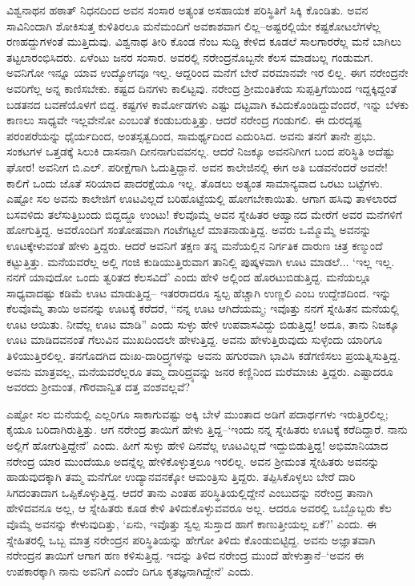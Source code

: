ವಿಶ್ವನಾಥನ ಹಠಾತ್ ನಿಧನದಿಂದ ಅವನ ಸಂಸಾರ ಅತ್ಯಂತ ಅಸಹಾಯಕ ಪರಿಸ್ಥಿತಿಗೆ ಸಿಕ್ಕಿ ಕೊಂಡಿತು. ಅವನ ಸಾವಿನಿಂದಾಗಿ ಶೋಕಿಸುತ್ತ ಕುಳಿತಿರಲೂ ಮನೆಮಂದಿಗೆ ಅವಕಾಶವಾಗ ಲಿಲ್ಲ–ಅಷ್ಟರಲ್ಲಿಯೇ ಕಷ್ಟಕೋಟಲೆಗಳೆಲ್ಲ ರಣಹದ್ದುಗಳಂತೆ ಮುತ್ತಿದುವು. ವಿಶ್ವನಾಥ ತೀರಿ ಕೊಂಡ ನೆಂಬ ಸುದ್ದಿ ಕೇಳಿದ ಕೂಡಲೆ ಸಾಲಗಾರರೆಲ್ಲ ಮನೆ ಬಾಗಿಲು ತಟ್ಟಲಾರಂಭಿಸಿದರು. ಏಳೆಂಟು ಜನರ ಸಂಸಾರ. ಅವರಲ್ಲಿ ನರೇಂದ್ರನೊಬ್ಬನೇ ಕೆಲಸ ಮಾಡಬಲ್ಲ ಗಂಡುಮಗ. ಅವನಿಗೋ ಇನ್ನೂ ಯಾವ ಉದ್ಯೋಗವೂ ಇಲ್ಲ. ಆದ್ದರಿಂದ ಮನೆಗೆ ಬೇರೆ ವರಮಾನವೇ ಇರ ಲಿಲ್ಲ. ಈಗ ನರೇಂದ್ರನೇ ಅವರಿಗೆಲ್ಲ ಅನ್ನ ಕಾಣಿಸಬೇಕು. ಕಷ್ಟದ ದಿನಗಳು ಕಾಲಿಟ್ಟವು. ನರೇಂದ್ರ ಶ್ರೀಮಂತಿಕೆಯ ಸುಪ್ಪತ್ತಿಗೆಯಿಂದ ಇದ್ದಕ್ಕಿದ್ದಂತೆ ಬಡತನದ ಬವಣೆಯೊಳಗೆ ಬಿದ್ದ. ಕಷ್ಟಗಳ ಕಾರ್ಮೋಡಗಳು ಎಷ್ಟು ದಟ್ಟವಾಗಿ ಕವಿದುಕೊಂಡಿದ್ದುವೆಂದರೆ, ಇನ್ನು ಬೆಳಕು ಕಾಣಲು ಸಾಧ್ಯವೇ ಇಲ್ಲವೇನೋ ಎಂಬಂತೆ ಕಂಡುಬರುತ್ತಿತ್ತು. ಆದರೆ ನರೇಂದ್ರ ಗಂಡುಗಲಿ. ಈ ದುರದೃಷ್ಟ ಪರಂಪರೆಯನ್ನು ಧೈರ್ಯದಿಂದ, ಅಂತಸ್ಸತ್ವದಿಂದ, ಸಾಮರ್ಥ್ಯದಿಂದ ಎದುರಿಸಿದ. ಅವನು ತನಗೆ ತಾನೇ ಪ್ರಭು. ಸಂಕಟಗಳ ಒತ್ತಡಕ್ಕೆ ಸಿಲುಕಿ ದಾಸನಾಗಿ ದೀನನಾಗುವವನಲ್ಲ. ಆದರೆ ನಿಜಕ್ಕೂ ಅವನನಿಗೀಗ ಬಂದ ಪರಿಸ್ಥಿತಿ ಅದೆಷ್ಟು ಘೋರ! ಅವನೀಗ ಬಿ.ಎಲ್. ಪರೀಕ್ಷೆಗಾಗಿ ಓದುತ್ತಿದ್ದಾನೆ. ಅವನ ಕಾಲೇಜಿನಲ್ಲಿ ಈಗ ಅತಿ ಬಡವನೆಂದರೆ ಅವನೇ! ಕಾಲಿಗೆ ಒಂದು ಜೊತೆ ಸರಿಯಾದ ಪಾದರಕ್ಷೆಯೂ ಇಲ್ಲ. ತೊಡಲು ಅತ್ಯಂತ ಸಾಮಾನ್ಯವಾದ ಒರಟು ಬಟ್ಟೆಗಳು. ಎಷ್ಟೋ ಸಲ ಅವನು ಕಾಲೇಜಿಗೆ ಊಟವಿಲ್ಲದೆ ಬರಿಹೊಟ್ಟೆಯಲ್ಲಿ ಹೋಗಬೇಕಾಯಿತು. ಆಗಾಗ ಹಸಿವು ತಾಳಲಾರದೆ ಬಸವಳಿದು ತಲೆಸುತ್ತಿಬಂದು ಬಿದ್ದದ್ದೂ ಉಂಟು! ಕೆಲವೊಮ್ಮೆ ಅವನ ಸ್ನೇಹಿತರ ಆಹ್ವಾನದ ಮೇರೆಗೆ ಅವರ ಮನೆಗಳಿಗೆ ಹೋಗುತ್ತಿದ್ದ. ಅವರೊಂದಿಗೆ ಸಂತೋಷವಾಗಿ ಗಂಟೆಗಟ್ಟಲೆ ಮಾತನಾಡುತ್ತಿದ್ದ. ಅವರು ಒಮ್ಮೊಮ್ಮೆ ಅವನನ್ನು ಊಟಕ್ಕೇಳುವಂತೆ ಹೇಳು ತ್ತಿದ್ದರು. ಆದರೆ ಅವನಿಗೆ ತಕ್ಷಣ ತನ್ನ ಮನೆಯಲ್ಲಿನ ನಿರ್ಗತಿಕ ದಾರುಣ ಚಿತ್ರ ಕಣ್ಮುಂದೆ ಕಟ್ಟುತ್ತಿತ್ತು. ಮನೆಯವರೆಲ್ಲ ಅಲ್ಲಿ ಗಂಜಿ ಕುಡಿಯುತ್ತಿರುವಾಗ ತಾನಿಲ್ಲಿ ಪುಷ್ಕಳವಾಗಿ ಊಟ ಮಾಡಲೆ... ‘ಇಲ್ಲ ಇಲ್ಲ. ನನಗೆ ಯಾವುದೋ ಒಂದು ತ್ವರಿತದ ಕೆಲಸವಿದೆ’ ಎಂದು ಹೇಳಿ ಅಲ್ಲಿಂದ ಹೊರಟುಬಿಡುತ್ತಿದ್ದ. ಮನೆಯಲ್ಲೂ ಸಾಧ್ಯವಾದಷ್ಟು ಕಡಿಮೆ ಊಟ ಮಾಡುತ್ತಿದ್ದ– ಇತರರಾದರೂ ಸ್ವಲ್ಪ ಹೆಚ್ಚಾಗಿ ಉಣ್ಣಲಿ ಎಂಬ ಉದ್ದೇಶದಿಂದ. ಇನ್ನು ಕೆಲವೊಮ್ಮೆ ತಾಯಿ ಅವನನ್ನು ಊಟಕ್ಕೆ ಕರೆದರೆ, “ನನ್ನ ಊಟ ಆಗಿದೆಯಮ್ಮ; ಇವೊತ್ತು ನನಗೆ ಸ್ನೇಹಿತನ ಮನೆಯಲ್ಲಿ ಊಟ ಆಯಿತು. ನೀವೆಲ್ಲ ಊಟ ಮಾಡಿ” ಎಂದು ಸುಳ್ಳು ಹೇಳಿ ಉಪವಾಸವಿದ್ದು ಬಿಡುತ್ತಿದ್ದ! ಅದೂ, ತಾನು ನಿಜಕ್ಕೂ ಊಟ ಮಾಡಿದವನಂತೆ ಗೆಲುವಿನ ಮುಖದಿಂದಲೇ ಹೇಳುತ್ತಿದ್ದ. ಅವನು ಹೇಳುತ್ತಿರುವುದು ಸುಳ್ಳೆಂದು ಯಾರಿಗೂ ತಿಳಿಯುತ್ತಿರಲಿಲ್ಲ. ತನಗೊದಗಿದ ದುಃಖ-ದಾರಿದ್ರ್ಯಗಳನ್ನು ಅವನು ಹಗುರವಾಗಿ ಭಾವಿಸಿ ಕಡೆಗಣಿಸಲು ಪ್ರಯತ್ನಿಸುತ್ತಿದ್ದ. ಅವನು ಮಾತ್ರವಲ್ಲ, ಮನೆಯವರೆಲ್ಲರೂ ತಮ್ಮ ದಾರಿದ್ರ್ಯವನ್ನು ಜನರ ಕಣ್ಣಿನಿಂದ ಮರೆಮಾಚು ತ್ತಿದ್ದರು. ಎಷ್ಟಾದರೂ ಅವರದು ಶ್ರೀಮಂತ, ಗೌರವಾನ್ವಿತ ದತ್ತ ವಂಶವಲ್ಲವೆ?

ಎಷ್ಟೋ ಸಲ ಮನೆಯಲ್ಲಿ ಎಲ್ಲರಿಗೂ ಸಾಕಾಗುವಷ್ಟು ಅಕ್ಕಿ ಬೇಳೆ ಮುಂತಾದ ಅಡಿಗೆ ಪದಾರ್ಥಗಳು ಇರುತ್ತಿರಲಿಲ್ಲ; ಕೈಯೂ ಬರಿದಾಗಿರುತ್ತಿತ್ತು. ಆಗ ನರೇಂದ್ರ ತಾಯಿಗೆ ಹೇಳು ತ್ತಿದ್ದ–‘ಇಂದು ನನ್ನ ಸ್ನೇಹಿತರು ಊಟಕ್ಕೆ ಕರೆದಿದ್ದಾರೆ. ನಾನು ಅಲ್ಲಿಗೆ ಹೋಗುತ್ತಿದ್ದೇನೆ’ ಎಂದು. ಹೀಗೆ ಸುಳ್ಳು ಹೇಳಿ ದಿನವೆಲ್ಲ ಊಟವಿಲ್ಲದೆ ಇದ್ದುಬಿಡುತ್ತಿದ್ದ! ಅಭಿಮಾನಿಯಾದ ನರೇಂದ್ರ ಯಾರ ಮುಂದೆಯೂ ಅದನ್ನೆಲ್ಲ ಹೇಳಿಕೊಳ್ಳುತ್ತಲೂ ಇರಲಿಲ್ಲ. ಅವನ ಶ್ರೀಮಂತ ಸ್ನೇಹಿತರು ಅವನನ್ನು ಹಾಡುವುದಕ್ಕಾಗಿ ತಮ್ಮ ಮನೆಗೋ ಉದ್ಯಾನವನಕ್ಕೋ ಆಮಂತ್ರಿಸು ತ್ತಿದ್ದರು. ತಪ್ಪಿಸಿಕೊಳ್ಳಲು ಬೇರೆ ದಾರಿ ಸಿಗದಂತಾದಾಗ ಒಪ್ಪಿಕೊಳ್ಳುತ್ತಿದ್ದ. ಆದರೆ ತಾನು ಎಂತಹ ಪರಿಸ್ಥಿತಿಯಲ್ಲಿದ್ದೇನೆ ಎಂಬುದನ್ನು ನರೇಂದ್ರ ತಾನಾಗಿ ಹೇಳಿದವನೂ ಅಲ್ಲ, ಆ ಸ್ನೇಹಿತರು ಕೂಡ ಕೇಳಿ ತಿಳಿದುಕೊಳ್ಳುವವರೂ ಅಲ್ಲ. ಆದರೂ ಅವರಲ್ಲಿ ಒಬ್ಬೊಬ್ಬರು ಕೆಲ ವೊಮ್ಮೆ ಅವನನ್ನು ಕೇಳುವುದಿತ್ತು, ‘ಏನು, ಇವೊತ್ತು ಸ್ವಲ್ಪ ಸುಸ್ತಾದ ಹಾಗೆ ಕಾಣುತ್ತೀಯಲ್ಲ ಏಕೆ?’ ಎಂದು. ಈ ಸ್ನೇಹಿತರಲ್ಲಿ ಒಬ್ಬ ಮಾತ್ರ ನರೇಂದ್ರನ ಪರಿಸ್ಥಿತಿಯನ್ನು ಹೇಗೋ ತಿಳಿದು ಕೊಂಡುಬಿಟ್ಟಿದ್ದ. ಅವನು ಅಜ್ಞಾತವಾಗಿ ನರೇಂದ್ರನ ತಾಯಿಗೆ ಆಗಾಗ ಹಣ ಕಳಿಸುತ್ತಿದ್ದ. ಇದನ್ನು ತಿಳಿದ ನರೇಂದ್ರ ಮುಂದೆ ಹೇಳುತ್ತಾನೆ–‘ಅವನ ಈ ಉಪಕಾರಕ್ಕಾಗಿ ನಾನು ಅವನಿಗೆ ಎಂದೆಂ ದಿಗೂ ಕೃತಜ್ಞನಾಗಿದ್ದೇನೆ’ ಎಂದು.

